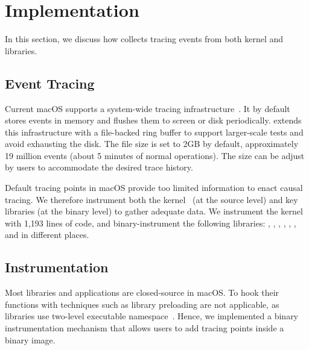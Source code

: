 \section{Implementation}\label{sec:implementation}

In this section, we discuss how \xxx collects tracing events from both kernel
and libraries.

\subsection{Event Tracing}

Current macOS supports a system-wide tracing
infrastructure~\cite{linktotracetool}. It by default stores events in memory and
flushes them to screen or disk periodically. \xxx extends this infrastructure
with a file-backed ring buffer to support larger-scale tests and avoid
exhausting the disk. The file size is set to 2GB by default, approximately 19
million events (about 5 minutes of normal operations). The size can be adjust by
users to accommodate the desired trace history.

Default tracing points in macOS provide too limited information to enact causal
tracing. We therefore instrument both the kernel~\cite{linkofxnusourcecode} (at
the source level) and key libraries (at the binary level) to gather adequate
data. We instrument the kernel with 1,193 lines of code, and binary-instrument
the following libraries: , ,
, , , ,
 and  in \nlibchanges different places.


\subsection{Instrumentation}

Most libraries and applications are closed-source in macOS. To hook their
functions with techniques such as library preloading are not applicable, as
libraries use two-level executable namespace~\cite{twolayernamespace}. Hence, we
implemented a binary instrumentation mechanism that allows users to add tracing
points inside a binary image.

